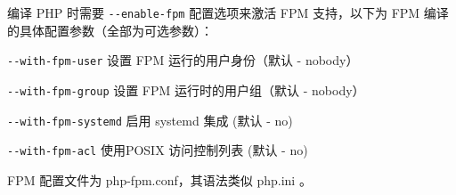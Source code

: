 编译 PHP 时需要 \texttt{-\/-enable-fpm} 配置选项来激活 FPM 支持，以下为 FPM 编译的具体配置参数（全部为可选参数）：

\begin{compactitem}
\item \texttt{-\/-with-fpm-user} 设置 FPM 运行的用户身份（默认 - nobody）

\item \texttt{-\/-with-fpm-group} 设置 FPM 运行时的用户组（默认 - nobody）

\item \texttt{-\/-with-fpm-systemd} 启用 systemd 集成 (默认 - no)

\item \texttt{-\/-with-fpm-acl} 使用POSIX 访问控制列表 (默认 - no)
\end{compactitem}

FPM 配置文件为 php-fpm.conf，其语法类似 php.ini 。


